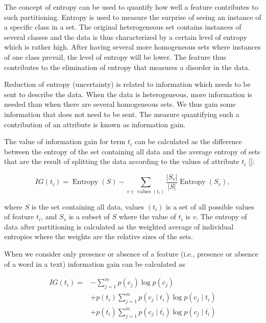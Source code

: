 The concept of entropy can be used to quantify how well a feature contributes to such partitioning. Entropy is used to measure the surprise of seeing an instance of a specific class in a set. The original heterogeneous set contains instances of several classes and the data is thus characterized by a certain level of entropy which is rather high. After having several more homogeneous sets where instances of one class prevail, the level of entropy will be lower. The feature thus contributes to the elimination of entropy that measures a disorder in the data.

Reduction of entropy (uncertainty) is related to information which needs to be sent to describe the data. When the data is heterogeneous, more information is needed than when there are several homogeneous sets. We thus gain some information that does not need to be sent. The measure quantifying such a contribution of an attribute is known as information gain.

The value of information gain for term $t_{i}$ can be calculated as the difference between the entropy of the set containing all data and the average entropy of sets that are the result of splitting the data according to the values of attribute $t_{i}$ [\cite{ref199}]:


\begin{equation*}
I G\left(t_{i}\right)=\operatorname{Entropy}(S)-\sum_{v \in \text { values }\left(t_{i}\right)} \frac{\left|S_{v}\right|}{|S|} \operatorname{Entropy}\left(S_{v}\right), \tag{14.18}
\end{equation*}


where $S$ is the set containing all data, values $\left(t_{i}\right)$ is a set of all possible values of feature $t_{i}$, and $S_{v}$ is a subset of $S$ where the value of $t_{i}$ is $v$. The entropy of data after partitioning is calculated as the weighted average of individual entropies where the weights are the relative sizes of the sets.

When we consider only presence or absence of a feature (i.e., presence or absence of a word in a text) information gain can be calculated as


\begin{align*}
I G\left(t_{i}\right)= & -\sum_{j=1}^{m} p\left(c_{j}\right) \log p\left(c_{j}\right) \\
& +p\left(t_{i}\right) \sum_{j=1}^{m} p\left(c_{j} \mid t_{i}\right) \log p\left(c_{j} \mid t_{i}\right)  \tag{14.19}\\
& +p\left(\overline{t_{i}}\right) \sum_{j=1}^{m} p\left(c_{j} \mid \overline{t_{i}}\right) \log p\left(c_{j} \mid \overline{t_{i}}\right)
\end{align*}


